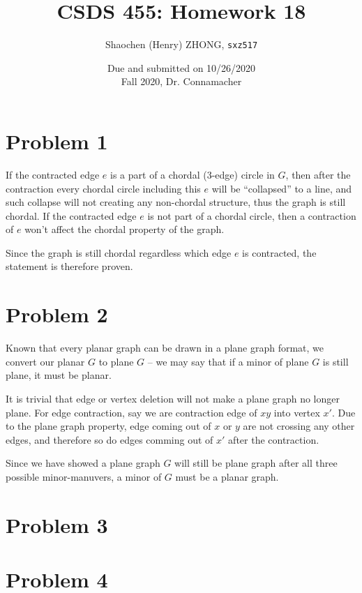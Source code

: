 \documentclass[11pt]{article}
\newcommand{\ilc}{\texttt}
\begin{document}
\title{\textbf{CSDS 455: Homework 18}}

\author{Shaochen (Henry) ZHONG, \ilc{sxz517}}
\date{Due and submitted on 10/26/2020 \\ Fall 2020, Dr. Connamacher}
\maketitle


\section*{Problem 1}

If the contracted edge $e$ is a part of a chordal (3-edge) circle in $G$, then after the contraction every chordal circle including this $e$ will be ``collapsed'' to a line, and such collapse will not creating any non-chordal structure, thus the graph is still chordal. If the contracted edge $e$ is not part of a chordal circle, then a contraction of $e$ won't affect the chordal property of the graph.

Since the graph is still chordal regardless which edge $e$ is contracted, the statement is therefore proven.

\section*{Problem 2}
Known that every planar graph can be drawn in a plane graph format, we convert our planar $G$ to plane $G$ -- we may say that if a minor of plane $G$ is still plane, it must be planar.\newline

It is trivial that edge or vertex deletion will not make a plane graph no longer plane. For edge contraction, say we are contraction edge of $xy$ into vertex $x'$. Due to the plane graph property, edge coming out of $x$ or $y$ are not crossing any other edges, and therefore so do edges comming out of $x'$ after the contraction.

Since we have showed a plane graph $G$ will still be plane graph after all three possible minor-manuvers, a minor of $G$ must be a planar graph.

\section*{Problem 3}


\section*{Problem 4}
\end{document}

